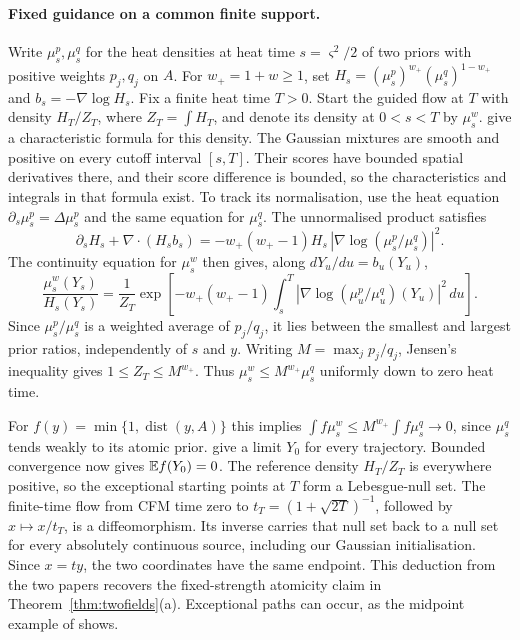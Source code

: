 \documentclass{article} %
\theoremstyle{plain}
\theoremstyle{definition}
\theoremstyle{remark}
\begin{document}
\paragraph{Fixed guidance on a common finite support.}
Write $\mu^p_s,\mu^q_s$ for the heat densities at heat time $s=\varsigma^2/2$ of two priors with positive weights $p_j,q_j$ on $A$.
For $w_+=1+w\ge1$, set $H_s=(\mu^p_s)^{w_+} (\mu^q_s)^{1-w_+}$ and $b_s=-\nabla\log H_s$.
Fix a finite heat time $T>0$. Start the guided flow at $T$ with density $H_T/Z_T$, where
$Z_T=\int H_T$, and denote its density at $0<s<T$ by $\mu^w_s$.
\citet[Theorem~4.2, Eq.~(16)]{jiang2026guidance} give a characteristic formula for this density.
The Gaussian mixtures are smooth and positive on every cutoff interval $[s,T]$. Their scores have
bounded spatial derivatives there, and their score difference is bounded, so the characteristics
and integrals in that formula exist. To track its normalisation, use the heat equation
$\partial_s \mu^p_s=\Delta \mu^p_s$ and the same equation for $\mu^q_s$. The unnormalised product satisfies
\[
 \partial_s H_s+\nabla\!\cdot(H_s b_s)
 =-w_+(w_+-1)H_s\,|\nabla\log(\mu^p_s/\mu^q_s)|^2 .
\]
The continuity equation for $\mu^w_s$ then gives, along $dY_u/du=b_u(Y_u)$,
\[
 \frac{\mu^w_s(Y_s)}{H_s(Y_s)}
 =\frac{1}{Z_T}\exp\!\left[-w_+(w_+-1)
 \int_s^T |\nabla\log(\mu^p_u/\mu^q_u)(Y_u)|^2\,du\right].
\]
Since $\mu^p_s/\mu^q_s$ is a weighted average of $p_j/q_j$, it lies between the smallest and largest
prior ratios, independently of $s$ and $y$. Writing $M=\max_j p_j/q_j$, Jensen's inequality
gives $1\le Z_T\le M^{w_+}$. Thus $\mu^w_s\le M^{w_+} \mu^q_s$ uniformly down to zero heat time.

For $f(y)=\min\{1,\operatorname{dist}(y,A)\}$ this implies
$\int f\mu^w_s\le M^{w_+}\int f \mu^q_s\to0$, since $\mu^q_s$ tends weakly to its atomic prior.
\citet[Theorem~2.5]{liu2026geometric} give a limit $Y_0$ for every trajectory. Bounded
convergence now gives $\mathbb{E} f(Y_0)=0$. The reference density $H_T/Z_T$ is everywhere positive,
so the exceptional starting points at $T$ form a Lebesgue-null set. The finite-time flow from
CFM time zero to $t_T=(1+\sqrt{2T})^{-1}$, followed by $x\mapsto x/t_T$, is a diffeomorphism.
Its inverse carries that null set back to a null set for every absolutely continuous source,
including our Gaussian initialisation. Since $x=t y$, the two coordinates have the same
endpoint. This deduction from the two papers recovers the fixed-strength atomicity claim in
Theorem~\ref{thm:twofields}(a). Exceptional paths can occur, as the midpoint example of
\citet[Remark~2.7]{liu2026geometric} shows.
\end{document}
